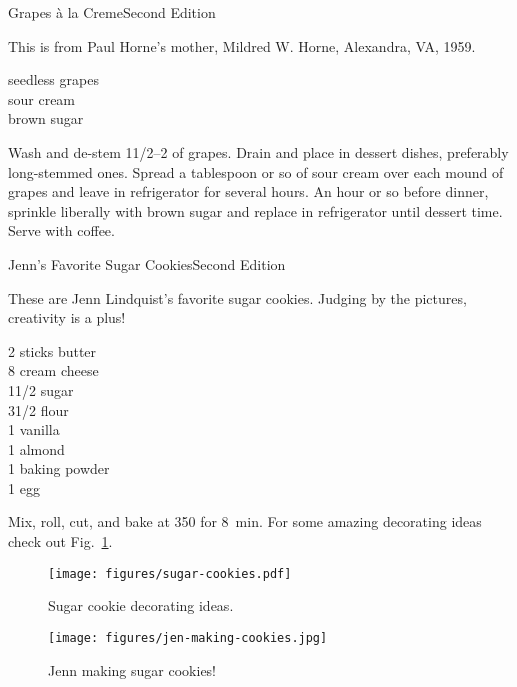 \begin{entry}{Grapes \`{a} la Creme}{Second Edition}

\begin{open}
    This is from Paul Horne's mother, Mildred W. Horne, Alexandra, VA, 1959.
\end{open}
\begin{ingredients}
    seedless grapes\\
    sour cream\\
    brown sugar
\end{ingredients}
Wash and de-stem 1\SIrange{1/2}{2}{\pound} of grapes. Drain and place in dessert
dishes, preferably long-stemmed ones.  Spread a tablespoon or so of sour cream
over each mound of grapes and leave in refrigerator for several hours.  An hour
or so before dinner, sprinkle liberally with brown sugar and replace in
refrigerator until dessert time.  Serve with coffee.
\end{entry}

\begin{entry}{Jenn's Favorite Sugar Cookies}{Second Edition}

\begin{open}
  These are Jenn Lindquist's favorite sugar cookies.  Judging by the pictures,
  creativity is a plus!
\end{open}
\begin{ingredients}
    2 sticks butter\\
    \SI{8}{\ounce} cream cheese\\
    1\SI{1/2}{\cup} sugar\\
    3\SI{1/2}{\cup} flour\\
    \SI{1}{\teaspoon} vanilla\\
    \SI{1}{\teaspoon} almond\\
    \SI{1}{\teaspoon} baking powder\\
    1 egg
\end{ingredients}
Mix, roll, cut, and bake at \SI{350}{\degreeF} for \SI{8}{\minute}.  For some
amazing decorating ideas check out Fig.~\ref{fig:sugar-cookie-decorating}.
\begin{figure}
    \centering
    \texttt{[image: figures/sugar-cookies.pdf]}
    \caption{Sugar cookie decorating ideas.}
    \label{fig:sugar-cookie-decorating}
\end{figure}
\begin{figure}[b]
    \centering
    \texttt{[image: figures/jen-making-cookies.jpg]}
    \caption{Jenn making sugar cookies!}
\end{figure}
\end{entry}

